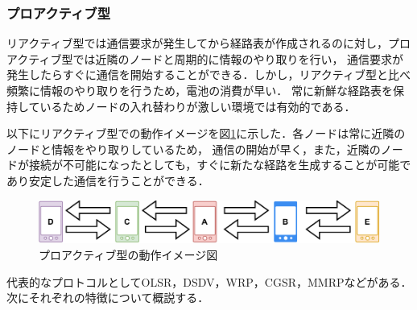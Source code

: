 \documentclass[a4paper, 11pt]{ltjsarticle}
\begin{document}
\clearpage
\subsubsection{プロアクティブ型}
リアクティブ型では通信要求が発生してから経路表が作成されるのに対し，プロアクティブ型では近隣のノードと周期的に情報のやり取りを行い，
通信要求が発生したらすぐに通信を開始することができる．しかし，リアクティブ型と比べ頻繁に情報のやり取りを行うため，電池の消費が早い．
常に新鮮な経路表を保持しているためノードの入れ替わりが激しい環境では有効的である．

以下にリアクティブ型での動作イメージを図\ref{proactive}に示した．各ノードは常に近隣のノードと情報をやり取りしているため，
通信の開始が早く，また，近隣のノードが接続が不可能になったとしても，すぐに新たな経路を生成することが可能であり安定した通信を行うことができる．
\begin{figure}[h]
  \centering
  \includegraphics[width=130mm]{proactive_model.pdf}
  \caption{プロアクティブ型の動作イメージ図}
  \label{proactive}
\end{figure}

代表的なプロトコルとしてOLSR，DSDV，WRP，CGSR，MMRPなどがある．
次にそれぞれの特徴について概説する．
\end{document}
